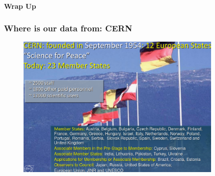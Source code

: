 \documentclass[11pt,xcolor=dvipsnames,aspectratio=169]{beamer}
\begin{document}
{
%
\begin{frame}
  \begin{center}
    \setlength{\parskip}{0pt}
    \vspace{10pt}
    {\Huge\bf Wrap Up}
  \end{center}
\end{frame}
}

\begin{frame}
  \frametitle{\bf Where is our data from: CERN}
  \vspace{-5pt}
      \begin{figure}
        \includegraphics[width=0.90\textwidth]{figures/l3/cern.png}
      \end{figure}
\end{frame}
\end{document}
